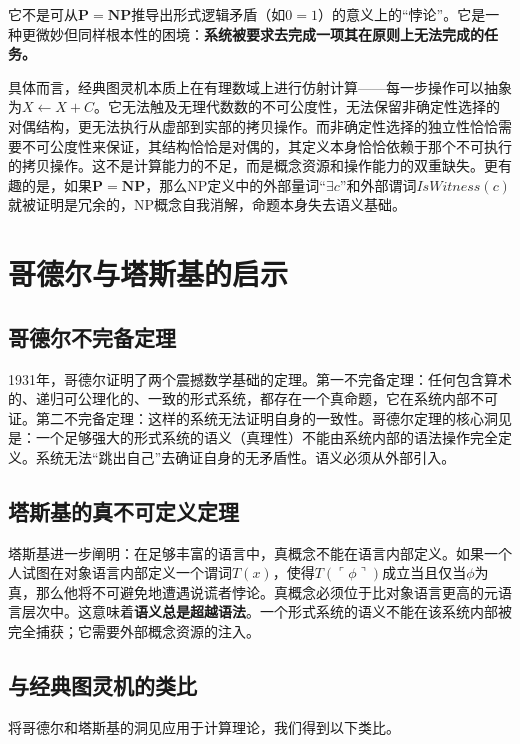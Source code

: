 \documentclass{ctexart}
\begin{document}
	它不是可从$\mathbf{P}=\mathbf{NP}$推导出形式逻辑矛盾（如$0=1$）的意义上的``悖论''。它是一种更微妙但同样根本性的困境：\textbf{系统被要求去完成一项其在原则上无法完成的任务。}
	
	具体而言，经典图灵机本质上在有理数域上进行仿射计算——每一步操作可以抽象为$X \leftarrow X + C$。它无法触及无理代数数的不可公度性，无法保留非确定性选择的对偶结构，更无法执行从虚部到实部的拷贝操作。而非确定性选择的独立性恰恰需要不可公度性来保证，其结构恰恰是对偶的，其定义本身恰恰依赖于那个不可执行的拷贝操作。这不是计算能力的不足，而是概念资源和操作能力的双重缺失。更有趣的是，如果$\mathbf{P}=\mathbf{NP}$，那么NP定义中的外部量词``$\exists c$''和外部谓词$IsWitness(c)$就被证明是冗余的，NP概念自我消解，命题本身失去语义基础。
	
	\section{哥德尔与塔斯基的启示}
	
	\subsection{哥德尔不完备定理}
	
	1931年，哥德尔证明了两个震撼数学基础的定理\cite{Godel1931}。第一不完备定理：任何包含算术的、递归可公理化的、一致的形式系统，都存在一个真命题，它在系统内部不可证。第二不完备定理：这样的系统无法证明自身的一致性。哥德尔定理的核心洞见是：一个足够强大的形式系统的语义（真理性）不能由系统内部的语法操作完全定义。系统无法``跳出自己''去确证自身的无矛盾性。语义必须从外部引入。
	
	\subsection{塔斯基的真不可定义定理}
	
	塔斯基\cite{Tarski1935}进一步阐明：在足够丰富的语言中，真概念不能在语言内部定义。如果一个人试图在对象语言内部定义一个谓词$T(x)$，使得$T(\ulcorner\phi\urcorner)$成立当且仅当$\phi$为真，那么他将不可避免地遭遇说谎者悖论。真概念必须位于比对象语言更高的元语言层次中。这意味着\textbf{语义总是超越语法}。一个形式系统的语义不能在该系统内部被完全捕获；它需要外部概念资源的注入。
	
	\subsection{与经典图灵机的类比}
	
	将哥德尔和塔斯基的洞见应用于计算理论，我们得到以下类比。
	
\end{document}
